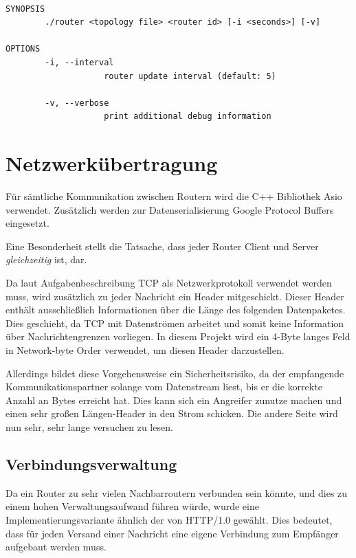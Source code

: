 \documentclass[a4paper,ngerman]{article}
\begin{document}
\begin{listing}
\begin{verbatim}

SYNOPSIS
        ./router <topology file> <router id> [-i <seconds>] [-v]

OPTIONS
        -i, --interval
                    router update interval (default: 5)

        -v, --verbose
                    print additional debug information
\end{verbatim}
\end{listing}

\section{Netzwerkübertragung}
\label{sec:networking}

Für sämtliche Kommunikation zwischen Routern wird die C++ Bibliothek Asio verwendet. Zusätzlich werden zur Datenserialisierung Google Protocol Buffers eingesetzt.

Eine Besonderheit stellt die Tatsache, dass jeder Router Client und Server \textit{gleichzeitig} ist, dar.

Da laut Aufgabenbeschreibung TCP als Netzwerkprotokoll verwendet werden muss, wird zusätzlich zu jeder Nachricht ein Header mitgeschickt. Dieser Header enthält ausschließlich Informationen über die Länge des folgenden Datenpaketes. Dies geschieht, da TCP mit Datenströmen arbeitet und somit keine Information über Nachrichtengrenzen vorliegen. In diesem Projekt wird ein 4-Byte langes Feld in Network-byte Order verwendet, um diesen Header darzustellen.

Allerdings bildet diese Vorgehensweise ein Sicherheitsrisiko, da der empfangende Kommunikationspartner solange vom Datenstream liest, bis er die korrekte Anzahl an Bytes erreicht hat. Dies kann sich ein Angreifer zunutze machen und einen sehr großen Längen-Header in den Strom schicken. Die andere Seite wird nun sehr, sehr lange versuchen zu lesen.

\subsection{Verbindungsverwaltung}

Da ein Router zu sehr vielen Nachbarroutern verbunden sein könnte, und dies zu einem hohen Verwaltungsaufwand führen würde, wurde eine Implementierungsvariante ähnlich der von HTTP/1.0 gewählt. Dies bedeutet, dass für jeden Versand einer Nachricht eine eigene Verbindung zum Empfänger aufgebaut werden muss.
\end{document}
